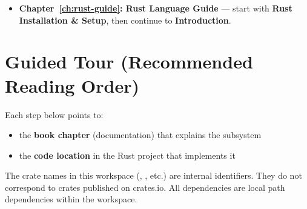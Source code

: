 \begin{itemize}
  \item \textbf{Chapter~\ref{ch:rust-guide}: Rust Language Guide} --- start with \textbf{Rust Installation \& Setup}, then continue to \textbf{Introduction}.
\end{itemize}

\section{Guided Tour (Recommended Reading Order)}
\label{sec:ch05-guided-tour}

Each step below points to:

\begin{itemize}
  \item the \textbf{book chapter} (documentation) that explains the subsystem
  \item the \textbf{code location} in the Rust project that implements it
\end{itemize}

\begin{notebox}
The crate names in this workspace (, , etc.) are internal identifiers. They do not correspond to crates published on crates.io. All dependencies are local path dependencies within the workspace.
\end{notebox}

